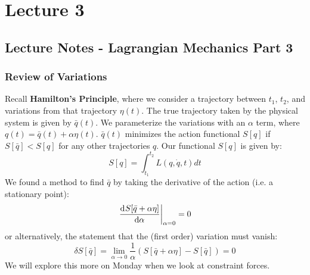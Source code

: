 \documentclass[../PHYS306Notes.tex]{subfiles}
\begin{document}
\section{Lecture 3}
\subsection{Lecture Notes - Lagrangian Mechanics Part 3}
\subsubsection{Review of Variations}
Recall \textbf{Hamilton's Principle}, where we consider a trajectory between $t_1$, $t_2$, and variations from that trajectory $\eta(t)$. The true trajectory taken by the physical system is given by $\bar{q}(t)$. We parameterize the variations with an $\alpha$ term, where $q(t) = \bar{q}(t) + \alpha\eta(t)$. $\bar{q}(t)$ minimizes the action functional $S[q]$ if $S[\bar{q}] < S[q]$ for any other trajectories $q$. Our functional $S[q]$ is given by:
\[S[q] = \int_{t_1}^{t_2}
L(q, \dot{q}, t)dt\]
We found a method to find $\bar{q}$ by taking the derivative of the action (i.e. a stationary point):
\[\left. \dod{S[\bar{q} + \alpha \eta]}{\alpha}\right|_{\alpha = 0} = 0\]
or alternatively, the statement that the (first order) variation must vanish:
\[\delta S[\bar{q}] = \lim_{\alpha \rightarrow 0} \frac{1}{\alpha}\left(S[\bar{q} + \alpha\eta] - S[\bar{q}]\right) = 0\]
We will explore this more on Monday when we look at constraint forces. 
\end{document}
